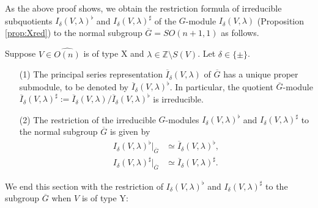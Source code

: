 As the above proof shows, 
 we obtain the restriction formula
 of irreducible subquotients
 $I_{\delta}(V,\lambda)^{\flat}$ and 
$I_{\delta}(V,\lambda)^{\sharp}$
 of the $G$-module
 $I_{\delta}(V,\lambda)$
 (Proposition \ref{prop:Xred})
 to the normal subgroup $\overline G=SO(n+1,1)$ as follows.  
\begin{proposition}
\label{prop:20180906}
Suppose $V \in \widehat{O(n)}$ is of type X
 and $\lambda \in {\mathbb{Z}} \setminus S(V)$.  
Let $\delta \in \{\pm\}$.  
\begin{enumerate}
\item[{\rm{(1)}}]
The principal series representation 
 $\overline I_{\delta}(V,\lambda)$ of $\overline G$
 has a unique proper submodule,
 to be denoted by
 $\overline I_{\delta}(V,\lambda)^{\flat}$.  
In particular,
 the quotient $\overline G$-module
$
   \overline I_{\delta}(V,\lambda)^{\sharp}
 :=\overline I_{\delta}(V,\lambda)/\overline I_{\delta}(V,\lambda)^{\flat}
$
 is irreducible.  
\item[{\rm{(2)}}]
The restriction of the irreducible $G$-modules
 $I_{\delta}(V,\lambda)^{\flat}$ and $I_{\delta}(V,\lambda)^{\sharp}$ 
 to the normal subgroup $\overline G$ is given by
\begin{align*}
 I_{\delta}(V,\lambda)^{\flat}|_{\overline G}
 & \simeq \overline I_{\delta}(V,\lambda)^{\flat}, 
\\
 I_{\delta}(V,\lambda)^{\sharp}|_{\overline G}
 & \simeq \overline I_{\delta}(V,\lambda)^{\sharp}.   
\end{align*}
\end{enumerate}
\end{proposition}
We end this section 
 with the restriction of $I_{\delta}(V,\lambda)^{\flat}$
 and $I_{\delta}(V,\lambda)^{\sharp}$
 to the subgroup $\overline G$
 when $V$ is of type Y:

